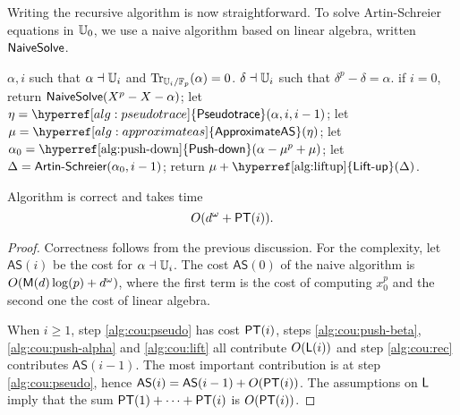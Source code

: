 Writing the recursive algorithm is now straightforward. To solve
Artin-Schreier equations in $\mathbb{U}_0$, we use a naive algorithm based on
linear algebra, written ${\sf NaiveSolve}$.

\begin{algorithm}
  \caption{\label{alg:artin-schreier}}
  \begin{algorithmic}[1]
    \REQUIRE $\alpha,i$ such that $\alpha\dashv\mathbb{U}_i$ and $\operatorname{Tr}_{\mathbb{U}_i/\mathbb{F}_p}(\alpha)=0$.
    \ENSURE $\delta\dashv\mathbb{U}_i$ such that $\delta^p-\delta=\alpha$.
    \STATE \label{alg:cou:base}if $i=0$, return ${\sf NaiveSolve}(X^p-X-\alpha)$;
    \STATE \label{alg:cou:pseudo} let $\eta = \hyperref[alg:pseudotrace]{\alg{Pseudotrace}}(\alpha, i,i-1)$;
    \STATE \label{alg:cou:push-beta} let $\mu= \hyperref[alg:approximateas]{\alg{ApproximateAS}}(\eta)$;
    \STATE \label{alg:cou:push-alpha} let $\alpha_0=\text{\hyperref[alg:push-down]{\alg{Push-down}}}(\alpha-\mu^p+\mu)$;
    \STATE \label{alg:cou:rec} let $\Delta =\text{{\sf Artin-Schreier}}(\alpha_0,i-1)$;
    \STATE \label{alg:cou:lift} return $\mu+\text{\hyperref[alg:liftup]{\alg{Lift-up}}}(\Delta)$.
  \end{algorithmic}
\end{algorithm}

\begin{theorem}\label{theo:AS}
  Algorithm \hyperref[alg:artin-schreier]{} is
  correct and takes time
  \begin{equation}
    \label{eq:109}
    O(d^\omega + \mathsf{PT}(i))
    \text{.}
  \end{equation}
\end{theorem}
\begin{proof} 
  Correctness follows from the previous discussion.  For the
  complexity, let $\mathsf{AS}(i)$ be the cost for $\alpha\dashv\mathbb{U}_i$. The
  cost $\mathsf{AS}(0)$ of the naive algorithm is $O(\mathsf{M}(d)\log(p) +
  d^\omega)$, where the first term is the cost of computing $x_0^p$
  and the second one the cost of linear algebra.

  When $i\ge1$, step \ref{alg:cou:pseudo} has cost $\mathsf{PT}(i)$, steps
  \ref{alg:cou:push-beta}, \ref{alg:cou:push-alpha} and
  \ref{alg:cou:lift} all contribute $O(\mathsf{L}(i))$ and step
  \ref{alg:cou:rec} contributes $\mathsf{AS}(i-1)$. The most important
  contribution is at step \ref{alg:cou:pseudo}, hence $\mathsf{AS}(i) =
  \mathsf{AS}(i-1) + O(\mathsf{PT}(i))$. The assumptions on $\mathsf{L}$ imply that
  the sum $\mathsf{PT}(1) + \cdots + \mathsf{PT}(i)$ is $O(\mathsf{PT}(i))$.
\end{proof}

